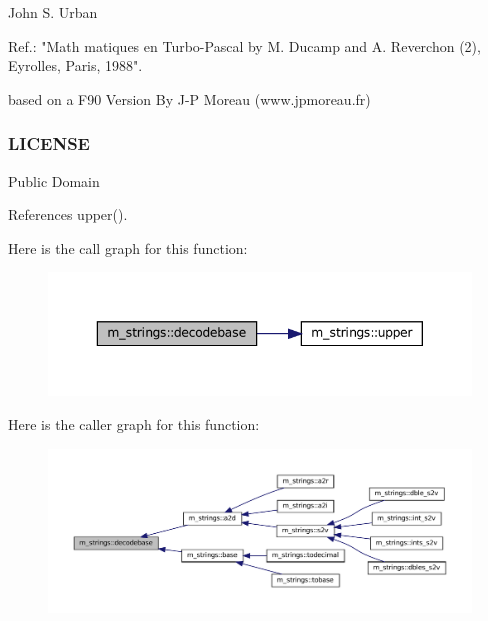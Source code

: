 John S. Urban

Ref.\+: "Math matiques en Turbo-\/\+Pascal by M. Ducamp and A. Reverchon (2), Eyrolles, Paris, 1988".

based on a F90 Version By J-\/P Moreau (www.\+jpmoreau.\+fr)

\subsubsection*{L\+I\+C\+E\+N\+SE}

Public Domain 

References upper().

Here is the call graph for this function\+:\nopagebreak
\begin{figure}[H]
\begin{center}
\leavevmode
\includegraphics[width=343pt]{namespacem__strings_a3883dae1b85c2d4a09d2d7e46ff422ab_cgraph}
\end{center}
\end{figure}
Here is the caller graph for this function\+:\nopagebreak
\begin{figure}[H]
\begin{center}
\leavevmode
\includegraphics[width=350pt]{namespacem__strings_a3883dae1b85c2d4a09d2d7e46ff422ab_icgraph}
\end{center}
\end{figure}
\mbox{\label{namespacem__strings_a9890da826d63d6f04367887007611cb5}} 
